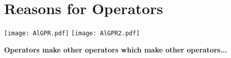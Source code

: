 



\chapter{Reasons for Operators}
\texttt{[image: AlGPR.pdf]}
\newpage
\texttt{[image: AlGPR2.pdf]}
\newpage




% 
\begin{center}
    \textbf{Operators make other operators which make other operators...}
\end{center}

